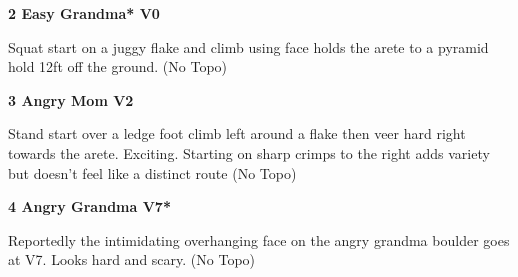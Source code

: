 \begin{multicols}{2}
\begin{minipage}{\columnwidth}
			\end{minipage}
			
					\begin{minipage}{\linewidth}	
					\label{rt:Easy Grandma}
\colorbox{green!20}{
\parbox{0.95\textwidth}{
\textbf{
2 Easy Grandma* V0   
}
}
}

					\begin{adjustwidth}{0.5cm}{}				
					Squat start on a juggy flake and climb using face holds the arete to a pyramid hold 12ft off the ground.
						\newline (No Topo) 
					\end{adjustwidth}
					\end{minipage}
					\begin{minipage}{\linewidth}	
					\label{rt:Angry Mom}
\colorbox{green!20}{
\parbox{0.95\textwidth}{
\textbf{
3 Angry Mom V2    \warn 
}
}
}

					\begin{adjustwidth}{0.5cm}{}				
					Stand start over a ledge foot climb left around a flake then veer hard right towards the arete. Exciting. Starting on sharp crimps to the right adds variety but doesn't feel like a distinct route
						\newline (No Topo) 
					\end{adjustwidth}
					\end{minipage}
					\begin{minipage}{\linewidth}	
					\label{rt:Angry Grandma}
\colorbox{Goldenrod!50}{
\parbox{0.95\textwidth}{
\textbf{
4 Angry Grandma V7*  
}
}
}

					\begin{adjustwidth}{0.5cm}{}				
					Reportedly the intimidating overhanging face on the angry grandma boulder goes at V7. Looks hard and scary.
						\newline (No Topo) 
					\end{adjustwidth}
					\end{minipage}
\end{multicols}
\clearpage